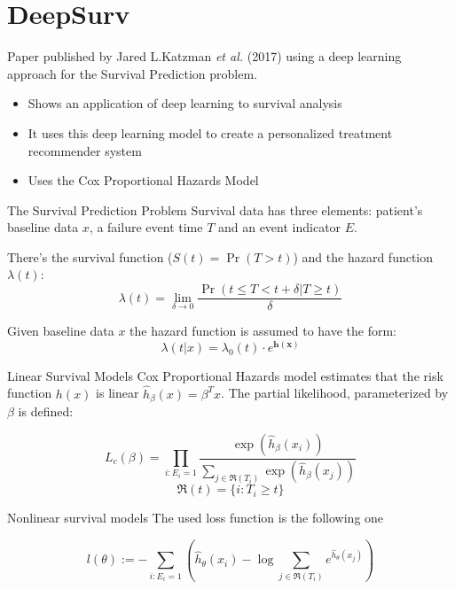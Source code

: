 \section{DeepSurv}

\begin{frame}{\insertsec}
    Paper published by Jared L.Katzman \emph{et al.} (2017) using a deep learning approach for
    the Survival Prediction problem.
    
    \begin{itemize}
        \item Shows an application of deep learning to survival analysis
        \item It uses this deep learning model to create a personalized treatment 
        recommender system
        \item Uses the Cox Proportional Hazards Model
    \end{itemize}
    
\end{frame}

\begin{frame}{The Survival Prediction Problem}
    Survival data has three elements: patient's baseline data \( x \), a failure event 
    time \( T \) and an event indicator \( E \).
    
    There's the survival function (\( S(t) = \Pr(T > t) \)) and the hazard function
    \( \lambda(t) \):
    \[
        \lambda(t) = \lim_{\delta \rightarrow 0} 
        \frac{\Pr(t \le T < t + \delta | T \ge t)}{\delta} 
    \]

    Given baseline data \( x \) the hazard function is assumed to have the form:
    \[
        \lambda(t | x) = \lambda_0 (t) \cdot e^{\bm{h(x)}}
    \]
\end{frame}

\begin{frame}{Linear Survival Models}
Cox Proportional Hazards model estimates that the risk function \( h(x) \) is linear 
\( \hat{h}_{\beta}(x) = \beta^T x \). The partial likelihood, parameterized by \( \beta \) is 
defined:

\[
    L_c (\beta) = \prod_{i:E_i = 1} \frac{\exp(\hat{h}_{\beta}(x_i))}
    {\sum_{j \in \mathfrak{R}(T_i)} \exp(\hat{h}_{\beta}(x_j))}
\]
\[
    \mathfrak{R}(t) = \{i: T_i \ge t\}
\]
    
\end{frame}

\begin{frame}{Nonlinear survival models}
The used loss function is the following one
    
\[
    l(\theta) := -\sum_{i:E_i = 1} \left(
    \hat{h}_{\theta}(x_i) - \log \sum_{j \in \mathfrak{R}(T_i)} e^{\hat{h}_{\theta} (x_j)}
    \right)
\]
\end{frame}